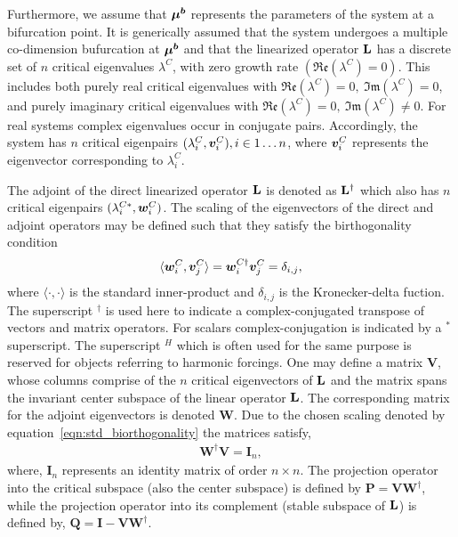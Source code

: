 Furthermore, we assume that $\boldsymbol{\mu^{b}}$ represents the parameters of the system at a bifurcation point. It is generically assumed that the system undergoes a multiple co-dimension bufurcation at $\boldsymbol{\mu^{b}}$ and that the linearized operator $\mathbf{L}$ has a discrete set of $n$ critical eigenvalues $\lambda^{C}$, with zero growth rate $(\mathfrak{Re}(\lambda^{C}) = 0)$. This includes both purely real critical eigenvalues with $\mathfrak{Re}(\lambda^{C}) = 0,\ \mathfrak{Im}(\lambda^{C}) = 0$, and purely imaginary critical eigenvalues with $\mathfrak{Re}(\lambda^{C}) = 0,\ \mathfrak{Im}(\lambda^{C}) \ne 0$. For real systems complex eigenvalues occur in conjugate pairs. Accordingly, the system has $n$ critical eigenpairs $(\lambda^{C}_{i},\boldsymbol{v}^{C}_{i}), i\in 1\ldots n$, where $\boldsymbol{v}^{C}_{i}$ represents the eigenvector corresponding to $\lambda^{C}_{i}$. 

The adjoint of the direct linearized operator $\mathbf{L}$ is denoted as $\mathbf{L}^{\dagger}$ which also has $n$ critical eigenpairs $(\lambda^{C*}_{i}, \boldsymbol{w}^{C}_{i})$. The scaling of the eigenvectors of the direct and adjoint operators may be defined such that they satisfy the birthogonality condition
\begin{eqnarray}
	\langle\boldsymbol{w}^{C}_{i},\boldsymbol{v}^{C}_{j}\rangle = \boldsymbol{w}^{C\dagger}_{i}\boldsymbol{v}^{C}_{j} = \delta_{i,j} \label{eqn:std_biorthogonality},
\end{eqnarray}
where $\langle\cdot,\cdot\rangle$ is the standard inner-product and $\delta_{i,j}$ is the Kronecker-delta fuction. The superscript $^{\dagger}$ is used here to indicate a complex-conjugated transpose of vectors and matrix operators. For scalars complex-conjugation is indicated by a $^{*}$ superscript. The superscript $^{H}$ which is often used for the same purpose is reserved for objects referring to harmonic forcings. One may define a matrix $\mathbf{V}$, whose columns comprise of the $n$ critical eigenvectors of $\mathbf{L}$ and the matrix spans the invariant center subspace of the linear operator $\mathbf{L}$. The corresponding matrix for the adjoint eigenvectors is denoted $\mathbf{W}$. Due to the chosen scaling denoted by equation~\eqref{eqn:std_biorthogonality} the matrices satisfy,
\begin{align}
	\label{eqn:biorthogonal_matrices}
	\mathbf{W}^{\dagger}\mathbf{V} = \mathbf{I}_{n},
\end{align}
where, $\mathbf{I}_{n}$ represents an identity matrix of order $n\times n$. The projection operator into the critical subspace (also the center subspace) is defined by $\mathbf{P} = \mathbf{V}\mathbf{W}^{\dagger}$, while the projection operator into its complement (stable subspace of $\mathbf{L}$) is defined by, $\mathbf{Q} = \mathbf{I} - \mathbf{V}\mathbf{W}^{\dagger}$. 


